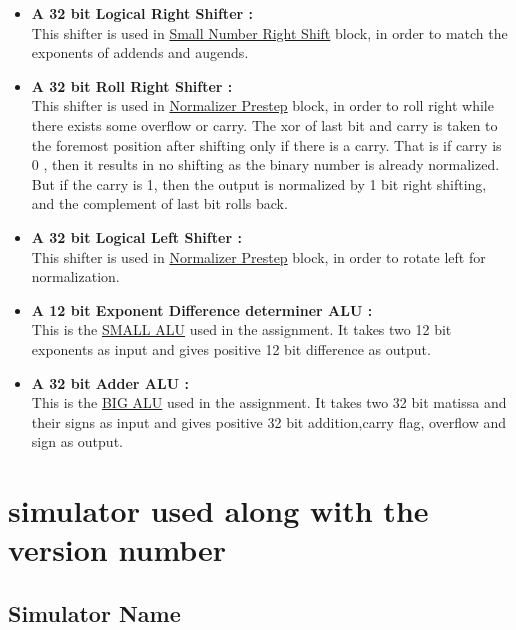 \documentclass[12pt]{article}
\begin{document}
\begin{itemize}
    \item \textbf{A 32 bit Logical Right Shifter : }\\

    This shifter is used in \underline{Small Number Right Shift} block, in order to match the exponents of addends and augends.

    \item \textbf{A 32 bit Roll Right Shifter : }\\

    This shifter is used in \underline{Normalizer Prestep} block, in order to roll right while there exists some overflow or carry. The xor of last bit and carry is taken to the foremost position after shifting only if there is a carry. That is if carry is 0 , then it results in no shifting as the binary number is already normalized. But if the carry is 1, then the output is normalized by 1 bit right shifting, and the complement of last bit rolls back.

    \item \textbf{A 32 bit Logical Left Shifter : }\\

    This shifter is used in \underline{Normalizer Prestep} block, in order to rotate left for normalization.

    \item \textbf{A 12 bit Exponent Difference determiner ALU : }\\

    This is the \underline{SMALL ALU} used in the assignment. It takes two 12 bit exponents as input and gives positive 12 bit difference as output.

    \item \textbf{A 32 bit Adder ALU : }\\

     This is the \underline{BIG ALU} used in the assignment. It takes two 32 bit matissa and their signs as input and gives positive 32 bit addition,carry flag, overflow and sign as output.
\end{itemize}


\section{simulator used along with the version number}

\subsection{Simulator Name}
\end{document}
